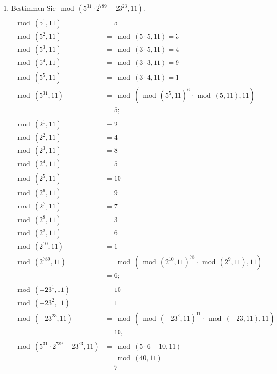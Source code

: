 \begin{enumerate}[label=(\alph*)]
		\item  Bestimmen Sie $ \bmod(5^{31} \cdot 2^{789}-23^{23}, 11) $. \
		\begin{align*}
			\\ \bmod(5^{1},11) &= 5
			\\ \bmod(5^{2},11) &= \bmod(5 \cdot 5, 11) = 3
			\\ \bmod(5^{3},11) &= \bmod(3 \cdot 5, 11) = 4
			\\ \bmod(5^{4},11) &= \bmod(3 \cdot 3, 11) = 9
			\\ \bmod(5^{5},11) &= \bmod(3 \cdot 4, 11) = 1
			\\ \bmod(5^{31},11) &= \bmod(\bmod(5^5,11)^6 \cdot \bmod(5,11), 11)  \\
			&=5;
			\\\\
			\bmod(2^1,11) &= 2 \\
			\bmod(2^2,11) &= 4 \\
			\bmod(2^3,11) &= 8 \\
			\bmod(2^4,11) &= 5 \\
			\bmod(2^5,11) &= 10 \\
			\bmod(2^6,11) &= 9 \\
			\bmod(2^7,11) &= 7 \\
			\bmod(2^8,11) &= 3 \\
			\bmod(2^9,11) &= 6 \\
			\bmod(2^{10},11) &= 1 \\
			\bmod(2^{789},11) &= \bmod(\bmod(2^{10},11)^{78} \cdot \bmod(2^9,11),11) \\
			&= 6;
			\\\\
			\bmod(-23^{1},11) &=10\\
			\bmod(-23^2,11)&= 1 \\
			\bmod(-23^{23},11) &= \bmod(\bmod(-23^2,11)^{11} \cdot \bmod(-23,11),11) \\ 
			&= 10;
			\\\\
			\bmod(5^{31} \cdot 2^{789}-23^{23}, 11) &= \bmod(5 \cdot 6 +10,11)
			\\&= \bmod(40,11)
			\\&= 7 
		\end{align*}


\end{enumerate}
